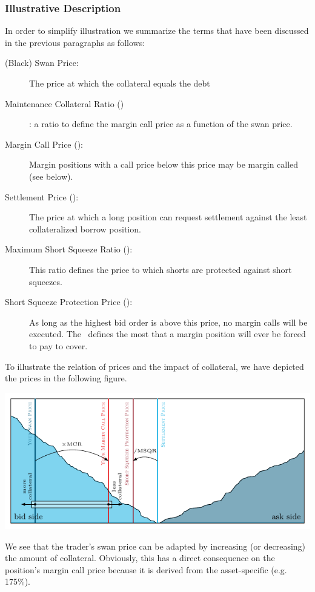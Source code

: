 \subsubsection{Illustrative Description}

In order to simplify illustration we summarize the terms that have been
discussed in the previous paragraphs as follows:
\begin{description}
 \item[(Black) Swan Price:] The price at which the collateral equals the debt
 \item[Maintenance Collateral Ratio (\MCR)]: a ratio to define the margin call
       price as a function of the swan price.
 \item[Margin Call Price (\MCP):] Margin positions with a call price below this price
       may be margin called (see below).
 \item[Settlement Price (\SP):] The price at which a long position can request
       settlement against the least collateralized borrow position.
 \item[Maximum Short Squeeze Ratio (\MSQR):] This ratio defines the price to
       which shorts are protected against short squeezes.
 \item[Short Squeeze Protection Price (\SQP):] As long as the highest bid order
       is above this price, no margin calls will be executed. The \SQP\ defines
       the most that a margin position will ever be forced to pay to cover.
\end{description}

To illustrate the relation of prices and the impact of collateral, we have
depicted the prices in the following figure.

\includegraphics[width=.9\linewidth,page=1]{figures/dex-engine-def.pdf}

We see that the trader's swan price can be adapted by increasing (or
decreasing) the amount of collateral. Obviously, this has a direct consequence
on the position's margin call price because it is derived from the
asset-specific \MCR (e.g. 175\%).

